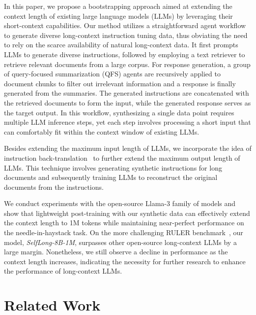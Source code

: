 \documentclass{article}
\begin{document}
In this paper,
we propose a bootstrapping approach aimed at extending the context length of existing large language models (LLMs)
by leveraging their short-context capabilities.
Our method utilizes a straightforward agent workflow to generate diverse long-context instruction tuning data,
thus obviating the need to rely on the scarce availability of natural long-context data.
It first prompts LLMs to generate diverse instructions,
followed by employing a text retriever to retrieve relevant documents from a large corpus.
For response generation,
a group of query-focused summarization (QFS) agents are recursively applied to
document chunks to filter out irrelevant information
and a response is finally generated from the summaries.
The generated instructions are concatenated with the retrieved documents to form the input,
while the generated response serves as the target output.
In this workflow,
synthesizing a single data point requires multiple LLM inference steps,
yet each step involves processing a short input
that can comfortably fit within the context window of existing LLMs.

Besides extending the maximum input length of LLMs,
we incorporate the idea of instruction back-translation~\citep{li2023self}
to further extend the maximum output length of LLMs.
This technique involves generating synthetic instructions for long documents
and subsequently training LLMs to reconstruct the original documents from the instructions.

We conduct experiments with the open-source Llama-3 family of models
and show that lightweight post-training with our synthetic data can effectively extend the context length to 1M tokens
while maintaining near-perfect performance on the needle-in-haystack task.
On the more challenging RULER benchmark~\citep{hsieh2024ruler},
our model,
\emph{SelfLong-8B-1M},
surpasses other open-source long-context LLMs by a large margin.
Nonetheless,
we still observe a decline in performance as the context length increases,
indicating the necessity for further research to enhance the performance of long-context LLMs.

\section{Related Work}
\end{document}

